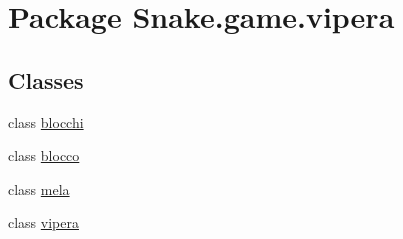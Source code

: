 \hypertarget{namespace_snake_1_1game_1_1vipera}{}\section{Package Snake.\+game.\+vipera}
\label{namespace_snake_1_1game_1_1vipera}
\subsection*{Classes}
\begin{DoxyCompactItemize}
\item 
class \mbox{\hyperlink{class_snake_1_1game_1_1vipera_1_1blocchi}{blocchi}}
\item 
class \mbox{\hyperlink{class_snake_1_1game_1_1vipera_1_1blocco}{blocco}}
\item 
class \mbox{\hyperlink{class_snake_1_1game_1_1vipera_1_1mela}{mela}}
\item 
class \mbox{\hyperlink{class_snake_1_1game_1_1vipera_1_1vipera}{vipera}}
\end{DoxyCompactItemize}

